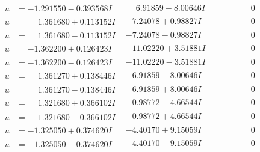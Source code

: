\documentclass[1p]{elsarticle_modified}
\theoremstyle{definition}
\begin{document}
$$\begin{array}{c|c|c}
 \hline 
\begin{aligned}
u &= -1.291550 - 0.393568 I\end{aligned}
 & \phantom{-}6.91859 - 8.00646 I & \phantom{-0.000000 } 0 \\ \hline\begin{aligned}
u &= \phantom{-}1.361680 + 0.113152 I\end{aligned}
 & -7.24078 + 0.98827 I & \phantom{-0.000000 } 0 \\ \hline\begin{aligned}
u &= \phantom{-}1.361680 - 0.113152 I\end{aligned}
 & -7.24078 - 0.98827 I & \phantom{-0.000000 } 0 \\ \hline\begin{aligned}
u &= -1.362200 + 0.126423 I\end{aligned}
 & -11.02220 + 3.51881 I & \phantom{-0.000000 } 0 \\ \hline\begin{aligned}
u &= -1.362200 - 0.126423 I\end{aligned}
 & -11.02220 - 3.51881 I & \phantom{-0.000000 } 0 \\ \hline\begin{aligned}
u &= \phantom{-}1.361270 + 0.138446 I\end{aligned}
 & -6.91859 - 8.00646 I & \phantom{-0.000000 } 0 \\ \hline\begin{aligned}
u &= \phantom{-}1.361270 - 0.138446 I\end{aligned}
 & -6.91859 + 8.00646 I & \phantom{-0.000000 } 0 \\ \hline\begin{aligned}
u &= \phantom{-}1.321680 + 0.366102 I\end{aligned}
 & -0.98772 - 4.66544 I & \phantom{-0.000000 } 0 \\ \hline\begin{aligned}
u &= \phantom{-}1.321680 - 0.366102 I\end{aligned}
 & -0.98772 + 4.66544 I & \phantom{-0.000000 } 0 \\ \hline\begin{aligned}
u &= -1.325050 + 0.374620 I\end{aligned}
 & -4.40170 + 9.15059 I & \phantom{-0.000000 } 0 \\ \hline\begin{aligned}
u &= -1.325050 - 0.374620 I\end{aligned}
 & -4.40170 - 9.15059 I & \phantom{-0.000000 } 0 \\ \hline\begin{aligned}

\end{aligned}
\end{array}$$
\end{document}
